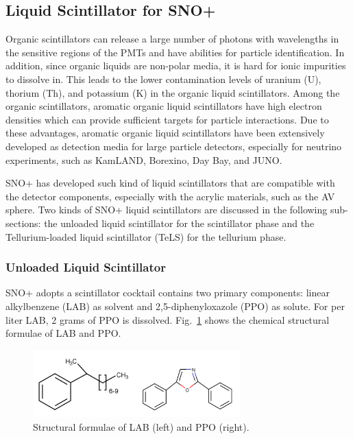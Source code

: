 \subsection{Liquid Scintillator for SNO+}
Organic scintillators can release a large number of photons with wavelengths in the sensitive regions of the PMTs and have abilities for particle identification. In addition, since organic liquids are non-polar media, it is hard for ionic impurities to dissolve in. This leads to the lower contamination levels of uranium (U), thorium (Th), and potassium (K) in the organic liquid scintillators. Among the organic scintillators, aromatic organic liquid scintillators have high electron densities which can provide sufficient targets for particle interactions\cite{PerkinElmer}. Due to these advantages, aromatic organic liquid scintillators have been extensively developed as detection media for large particle detectors, especially for neutrino experiments, such as KamLAND, Borexino, Day Bay, and JUNO\cite{scintillatorPaper}.

SNO+ has developed such kind of liquid scintillators that are compatible with the detector components, especially with the acrylic materials, such as the AV sphere. Two kinds of SNO+ liquid scintillators are discussed in the following sub-sections: the unloaded liquid scintillator for the scintillator phase and the Tellurium-loaded liquid scintillator (TeLS) for the tellurium phase.

\subsubsection{Unloaded Liquid Scintillator}
SNO+ adopts a scintillator cocktail contains two primary components: linear alkylbenzene (LAB) as solvent and 2,5-diphenyloxazole (PPO) as solute. For per liter LAB, 2 grams of PPO is dissolved. Fig.~\ref{labppo-molecule} shows the chemical structural formulae of LAB and PPO\cite{scintillatorPaper}.
\begin{figure}[!htb]
	\centering
	\includegraphics[width=8cm]{lab-ppo-molecule.png}
	\caption{Structural formulae of LAB (left) and PPO (right).}
	\label{labppo-molecule}
\end{figure}

